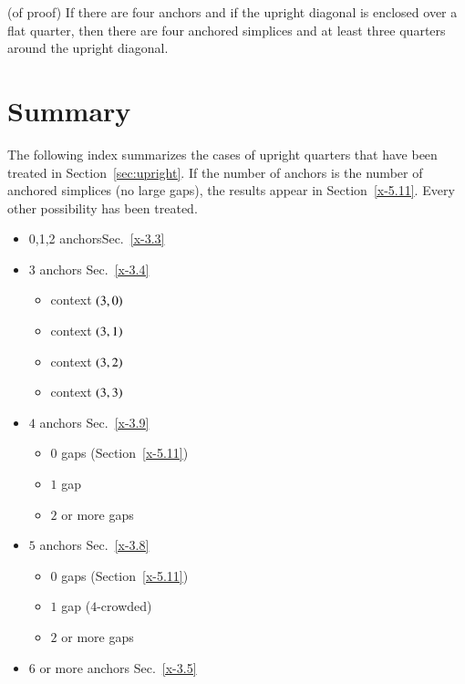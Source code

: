 \begin{corollary}  (of proof)\quad
If there are four anchors and if the upright diagonal is enclosed over a
flat quarter, then there are four anchored simplices and at least three
quarters around the upright diagonal.
\end{corollary}

\section{Summary} %
    \label{sec:upright-summary}

The following index summarizes the cases of upright quarters that have
been treated in Section~\ref{sec:upright}. If the number of anchors is
the number of anchored simplices (no large gaps), the results appear in
Section~\ref{x-5.11}. Every other possibility has been treated.

    \begin{itemize}
    \item 0,1,2 anchors\hfill Sec.~\ref{x-3.3}
    \item $3$ anchors \hfill Sec.~\ref{x-3.4}
        \begin{itemize}
        \item context $\relax(3,0)$
        \item context $\relax(3,1)$
        \item context $\relax(3,2)$
        \item context $\relax(3,3)$
        \end{itemize}
    \item $4$ anchors \hfill Sec.~\ref{x-3.9}
        \begin{itemize}
        \item $0$ gaps (Section~\ref{x-5.11})
        \item $1$ gap
        \item $2$ or more gaps
        \end{itemize}
    \item $5$ anchors \hfill Sec.~\ref{x-3.8}
        \begin{itemize}
        \item $0$ gaps (Section~\ref{x-5.11})
        \item $1$ gap ($4$-crowded)
        \item $2$ or more gaps
        \end{itemize}
    \item $6$ or more anchors \hfill Sec.~\ref{x-3.5}
    \end{itemize}


